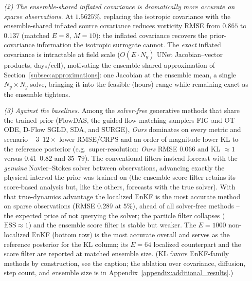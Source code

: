 \emph{(2) The ensemble-shared inflated covariance is dramatically more accurate on sparse observations.} At $1.5625\%$, replacing the isotropic covariance with the ensemble-shared inflated source covariance reduces vorticity RMSE from $0.865$ to $0.137$ (matched $E=8$, $M=10$): the inflated covariance recovers the prior-covariance information the isotropic surrogate cannot. The \emph{exact} inflated covariance is intractable at field scale ($O(E\cdot N_y)$ UNet Jacobian--vector products, days/cell), motivating the ensemble-shared approximation of Section~\ref{subsec:approximations}: one Jacobian at the ensemble mean, a single $N_y\times N_y$ solve, bringing it into the feasible (hours) range while remaining exact as the ensemble tightens.

\emph{(3) Against the baselines.} Among the \emph{solver-free} generative methods that share the trained prior (FlowDAS, the guided flow-matching samplers FIG and OT-ODE, D-Flow SGLD, SDA, and SURGE), \emph{Ours} dominates on every metric and scenario -- $3$--$12\times$ lower RMSE/CRPS and an order of magnitude lower KL to the reference posterior (e.g.\ super-resolution: \emph{Ours} RMSE $0.066$ and KL $\approx1$ versus $0.41$--$0.82$ and $35$--$79$). The conventional filters instead forecast with the \emph{genuine} Navier--Stokes solver between observations, advancing exactly the physical interval the prior was trained on (the ensemble score filter retains its score-based analysis but, like the others, forecasts with the true solver). With that true-dynamics advantage the localized EnKF is the most accurate method on sparse observations (RMSE $0.289$ at $5\%$), ahead of all solver-free methods -- the expected price of not querying the solver; the particle filter collapses ($\mathrm{ESS}\!\approx\!1$) and the ensemble score filter is stable but weaker. The $E=1000$ non-localized EnKF (bottom row) is the most accurate overall and serves as the reference posterior for the KL column; its $E=64$ localized counterpart and the score filter are reported at matched ensemble size. (KL favors EnKF-family methods by construction, see the caption; the ablation over covariance, diffusion, step count, and ensemble size is in Appendix~\ref{appendix:additional_results}.)


